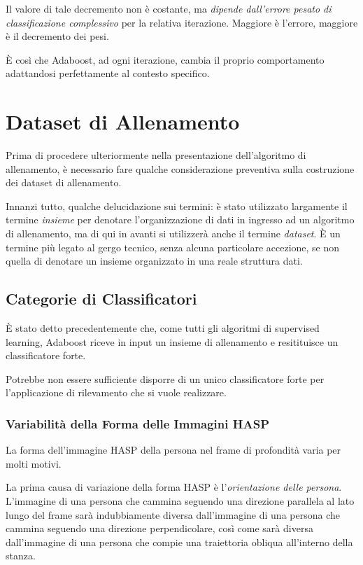                 Il valore di tale decremento non è costante, ma \emph{dipende dall'errore pesato di classificazione complessivo} per la relativa iterazione. 
                Maggiore è l'errore, maggiore è il decremento dei pesi.
                
                È così che Adaboost, ad ogni iterazione, cambia il proprio comportamento adattandosi perfettamente al contesto specifico.

    \section{Dataset di Allenamento}
    \label{sec:training_dataset}
        Prima di procedere ulteriormente nella presentazione dell'algoritmo di allenamento, è necessario fare qualche considerazione preventiva sulla costruzione dei dataset di allenamento.

        Innanzi tutto, qualche delucidazione sui termini: è stato utilizzato largamente il termine \emph{insieme} per denotare l'organizzazione di dati in ingresso ad un algoritmo di allenamento, ma di qui in avanti si utilizzerà anche il termine \emph{dataset}.
        È un termine più legato al gergo tecnico, senza alcuna particolare accezione, se non quella di denotare un insieme organizzato in una reale struttura dati.

        \subsection{Categorie di Classificatori}
        \label{sub:classifiers_categories}
            È stato detto precedentemente che, come tutti gli algoritmi di supervised learning, Adaboost riceve in input un insieme di allenamento e resitituisce un classificatore forte.

            Potrebbe non essere sufficiente disporre di un unico classificatore forte per l'applicazione di rilevamento che si vuole realizzare.

            \subsubsection{Variabilità della Forma delle Immagini HASP}
                La forma dell'immagine HASP della persona nel frame di profondità varia per molti motivi.

                La prima causa di variazione della forma HASP è l'\emph{orientazione delle persona}.
                L'immagine di una persona che cammina seguendo una direzione parallela al lato lungo del frame sarà indubbiamente diversa dall'immagine di una persona che cammina seguendo una direzione perpendicolare, così come sarà diversa dall'immagine di una persona che compie una traiettoria obliqua all'interno della stanza.

